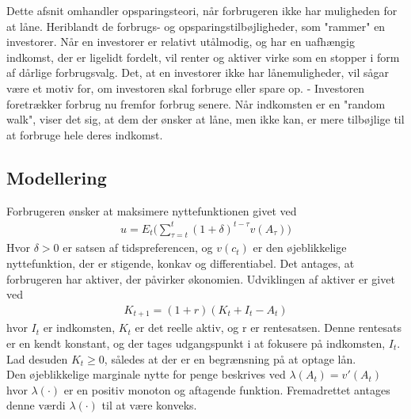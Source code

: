 Dette afsnit omhandler opsparingsteori, når forbrugeren ikke har muligheden for at låne. Heriblandt de forbrugs- og opsparingstilbøjligheder, som "rammer" en investorer. Når en investorer er relativt utålmodig, og har en uafhængig indkomst, der er ligelidt fordelt, vil renter og aktiver virke som en stopper i form af dårlige forbrugsvalg. Det, at en investorer ikke har lånemuligheder, vil sågar være et motiv for, om investoren skal forbruge eller spare op. - Investoren foretrækker forbrug nu fremfor forbrug senere.
Når indkomsten er en "random walk", viser det sig, at dem der ønsker at låne, men ikke kan, er mere tilbøjlige til at forbruge hele deres indkomst.





\subsection*{Modellering}
Forbrugeren ønsker at maksimere nyttefunktionen givet ved
\begin{align}
    u = E_t\big(\sum_{\tau=t}^t (1+\delta)^{t-\tau}v(A_\tau)\big)
\end{align}
Hvor $\delta > 0$ er satsen af tidspreferencen, og $v(c_t)$ er den øjeblikkelige nyttefunktion, der er stigende, konkav og differentiabel.
Det antages, at forbrugeren har aktiver, der påvirker økonomien. Udviklingen af aktiver er givet ved
\begin{align}
    K_{t+1}=(1+r)(K_t+I_t-A_t)
\end{align}
hvor $I_t$ er indkomsten, $K_t$ er det reelle aktiv, og r er rentesatsen. Denne rentesats er en kendt konstant, og der tages udgangspunkt i at fokusere på indkomsten, $I_t$. 
Lad desuden $K_t \geq 0$, således at der er en begrænsning på at optage lån.\\
Den øjeblikkelige marginale nytte for penge beskrives ved
$\lambda(A_t)=v'(A_t)$
hvor $\lambda(\cdot)$ er en positiv monoton og aftagende funktion. Fremadrettet antages denne værdi $\lambda(\cdot)$ til at være konveks. 



